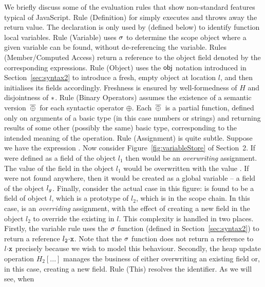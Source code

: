 \documentclass{article}
\begin{document}
%
We briefly discuss some of the evaluation rules that show non-standard features typical of JavaScript.
Rule (Definition) for  simply executes  and throws
away the return value. The  declaration is only used by  (defined below) to identify function local variables.
% 
Rule (Variable) uses $\sigma$ to determine the scope object where a given variable can be found, without de-referencing the variable.
%
Rules (Member/Computed Access) return a reference to the object field denoted by the corresponding expressions.
%
Rule (Object) uses the $\mathsf{obj}$ notation introduced in
Section~\ref{sec:syntax2} to introduce a fresh, empty object at location $l$, and then initialises its fields accordingly.
%
Freshness is ensured by well-formedness of $H$ and disjointness of $\mathbin{*}$.
%
Rule (Binary Operators) assumes the existence of a semantic version $\,{\overline{\oplus}}\,$ for each syntactic operator $\oplus$.  
%
Each $\,{\overline{\oplus}}\,$ is a partial function, defined only on arguments of a basic type (in this case numbers or strings) and returning results of some other (possibly the same) basic type, corresponding to the intended meaning of the operation. 
%
Rule (Assignment) is quite subtle.
%
Suppose we have the expression .
%
Now consider Figure~\ref{fig:variableStore} of Section~2. If  were defined as
a field of the object $l_1$ then  would be an
\emph{overwriting} assignment. The value of the field  in the
object $l_1$ would be overwritten with the value .
%
If  were not found anywhere, then it would be created as a global
variable -- a field of the object $l_g$.
%
Finally, consider the actual case in this figure:  is found to
be a field of object $l$, which is a prototype of $l_2$, which is in the scope chain.
%
In this case,  is an \emph{overriding} assignment, with the
effect of creating a new field  in the object $l_2$ to override
the existing  in $l$.
%
This complexity is handled in two places. Firstly, the variable rule uses the
$\sigma$ function  (defined in Section~\ref{sec:syntax2}) to return a
reference $l_2\sv\js{x}$. Note that the $\sigma$ function  does not
return a reference to $l\sv\js{x}$ precisely because we wish to model
this behaviour. Secondly, the heap update operation $H_2[...]$ manages
the business of either overwriting an existing field or,  in this case,
creating a new field.
%
Rule (This) resolves the  identifier. As we will see, when
\end{document}
